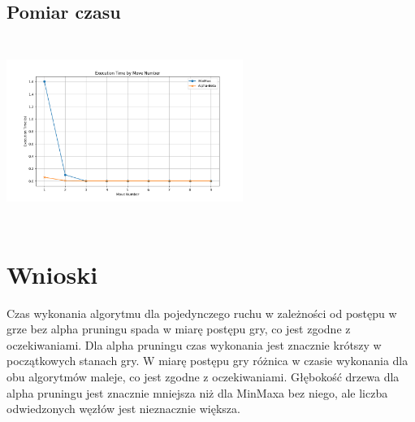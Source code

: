 \documentclass{article}
\begin{document}
\subsection{Pomiar czasu}

\includegraphics[width=7.7cm, height=6cm]{execution_time.png}


\section{Wnioski}

Czas wykonania algorytmu dla pojedynczego ruchu w zależności od postępu w grze bez alpha pruningu spada w miarę postępu gry, co jest zgodne z oczekiwaniami.
Dla alpha pruningu czas wykonania jest znacznie krótszy w początkowych stanach gry. W miarę postępu gry różnica w czasie wykonania dla obu algorytmów maleje, co jest zgodne z oczekiwaniami.
Głębokość drzewa dla alpha pruningu jest znacznie mniejsza niż dla MinMaxa bez niego, ale liczba odwiedzonych węzłów jest nieznacznie większa.
\end{document}
